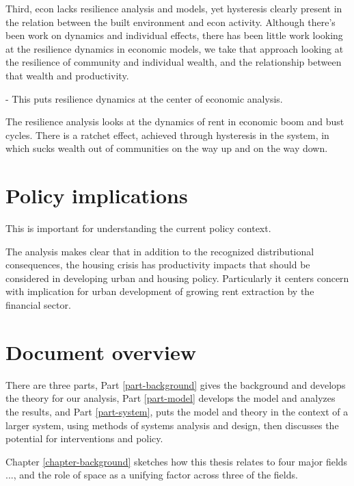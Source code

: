 
Third, econ lacks resilience analysis and models, yet hysteresis clearly present in the relation between the built environment and econ activity. Although there's been work on dynamics and individual effects, there has been little work looking at the resilience dynamics in economic models, we take that approach looking at the resilience of community and individual wealth, and the relationship between that wealth and productivity. 

- This puts resilience dynamics at the center of economic analysis.

The resilience analysis looks at the dynamics of rent in economic boom and bust cycles.
There is a ratchet effect, achieved through hysteresis in the system, in which sucks wealth out of communities on the way up and on the way down. %


\section{Policy implications}

This is important for understanding the current policy context. 

The analysis makes clear that in addition to the recognized distributional consequences, the housing crisis has productivity impacts that should be considered in developing urban and housing policy. Particularly it centers concern with implication for urban development of growing rent extraction by the financial sector. 


\section{Document overview}

There are three parts, Part \ref{part-background} gives the background and develops the theory for our analysis, Part \ref{part-model} develops the model and analyzes the results, and Part \ref{part-system}, puts the model and theory in the context of a larger system, using methods of systems analysis and design, then discusses the potential for interventions and policy.

Chapter \ref{chapter-background} sketches how this thesis relates to four major fields ..., and the role of space as a unifying factor across three of the fields.

